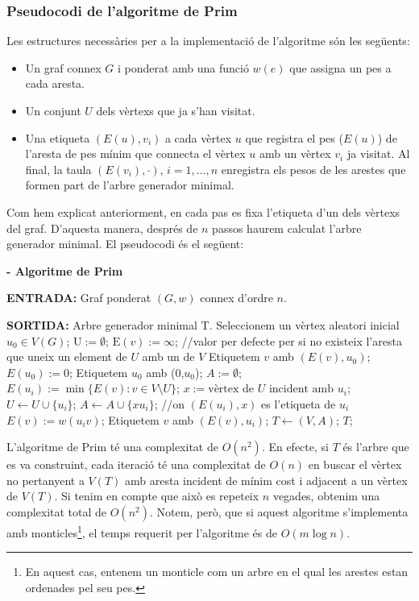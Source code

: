 \documentclass{article}
\renewcommand{\algorithmicrequire}{\textbf{ENTRADA: }}
\renewcommand{\algorithmicensure}{\textbf{SORTIDA: }}
\begin{document}
\subsubsection{Pseudocodi de l'algoritme de Prim}
Les estructures necessàries per a la implementació de l'algoritme són les següents:
\begin{itemize}
    \item Un graf connex $G$ i ponderat amb una funció $w(e)$ que assigna un pes a cada aresta.
    \item Un conjunt $U$ dels vèrtexs que ja s'han visitat.
    \item Una etiqueta $(E(u),v_i)$ a cada vèrtex $u$ que registra el pes ($E(u)$) de l'aresta de pes mínim que connecta el vèrtex $u$ amb un vèrtex $v_i$ ja visitat. Al final, la taula $(E(v_i),\cdot)$, $i=1,\ldots,n$ enregistra els pesos de les arestes que formen part de l'arbre generador minimal.
\end{itemize}
Com hem explicat anteriorment, en cada pas es fixa l'etiqueta d'un dels vèrtexs del graf. D'aquesta manera, després de $n$ passos haurem calculat l'arbre generador minimal. El pseudocodi és el següent:
\begin{algorithm}[H]
    \caption{\textbf{- Algoritme de Prim}}
    \begin{algorithmic}
        \item \algorithmicrequire{Graf ponderat $(G,w)$ connex d’ordre $n$.}
        \item \algorithmicensure{Arbre generador minimal T.}
        \State
        \State Seleccionem un vèrtex aleatori inicial $u_0\in V(G)$;
        \State $\text{U}:=\emptyset$;
        \State $\text{E}(v):=\infty$;  //valor per defecte per si no existeix l'aresta que uneix un element de $U$ amb un de $V$
        \State Etiquetem $v$ amb $(E(v),u_0)$;
        \EndFor
        \State $E(u_0):=0$;
        \State Etiquetem ${u_0}$ amb (0,${u_0}$);
        \State $A:=\emptyset$;
        \State $E(u_i):=\min\{E(v): v\in V\setminus U\}$;
        \State $x:=\text{vèrtex de $U$ incident amb $u_i$}$;
        \State$U\gets U\cup \{u_i\}$;
        \State$A\gets A\cup \{xu_i\}$; //on $(E(u_i),x)$ es l'etiqueta de $u_i$
        \State $E(v):=w(u_iv)$;
        \State Etiquetem $v$ amb $(E(v),u_i)$;
        \EndIf
        \EndFor
        \EndFor
        \State $T \gets (V,A)$;
        \State\Return $T$;
    \end{algorithmic}
\end{algorithm}
\par\cite{7}\par
L’algoritme de Prim té una complexitat de $O(n^2)$. En efecte, si $T$ és l'arbre que es va construint, cada iteració té una complexitat de $O(n)$ en buscar el vèrtex no pertanyent a $V(T)$ amb aresta incident de mínim cost i adjacent a un vèrtex de $V(T)$. Si tenim en compte que això es repeteix $n$ vegades, obtenim una complexitat total de $O(n^2)$. Notem, però, que si aquest algoritme s’implementa amb monticles\footnote{En aquest cas, entenem un monticle com un arbre en el qual les arestes estan ordenades pel seu pes.}, el temps requerit per l’algoritme és de $O(m\log n)$. \cite{6}
\end{document}
